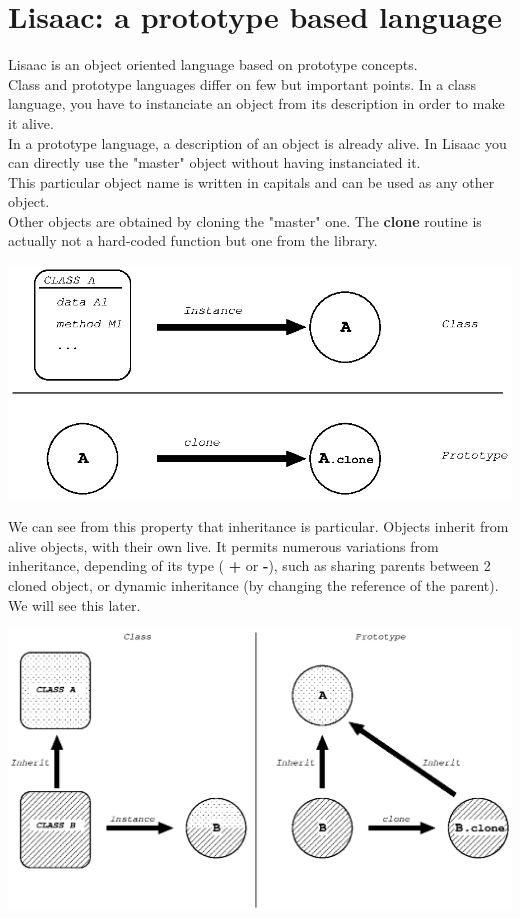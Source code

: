 \documentclass[11pt]{mybook}
\newcommand{\en}[1]
{
  \if \englishversion 1
  #1
  \fi
}
\begin{document}
\section{Lisaac: a prototype based language}
\label{quickstart:prototype_language}
%
\en{Lisaac is an object oriented language based on prototype concepts.\\
Class and prototype languages differ on few but important points. \index{Class} \index{Prototype}
In a class language, you have to instanciate an object from its description in order to make it alive.\\
In a prototype language, a description of an object is already alive. In Lisaac you can directly use the 
"master" object without having instanciated it. \index{Object}\\
This particular object name is written in capitals and can be used as any other object.\\
Other objects are obtained by cloning the "master" one. The {\bf{}clone} routine is actually not a hard-coded function but one from the library.
\begin{center}
	\includegraphics[scale=0.9]{figures/class_vs_prototype1} 
\end{center}
We can see from this property that inheritance is particular. Objects inherit from alive objects, with their own live. 
It permits numerous variations from inheritance, depending of its type ({\bf{} +} or {\bf{} -}), such as sharing parents 
between 2 cloned object, or dynamic inheritance (by changing the reference of the parent). We will see this later.
\begin{center}
	\includegraphics[scale=0.9]{figures/class_vs_prototype2} 

\end{center}}
\end{document}
